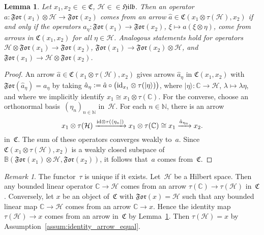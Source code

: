 \documentclass[a4paper]{amsart}
\numberwithin{equation}{section}
\theoremstyle{plain}
\numberwithin{theorem}{section}
\newtheorem{lemma}[theorem]{Lemma}
\theoremstyle{definition}
\theoremstyle{remark}
\newtheorem{remark}[theorem]{Remark}
\newcommand*{\ket}[1]{\lvert#1\rangle}%
\newcommand*{\bra}[1]{\langle#1\rvert}
\newcommand*{\inOb}{\mathrel{\in\in}}%
\newcommand*{\Cat}{\mathfrak C}     %
\newcommand*{\Hilb}{\mathfrak{Hilb}}%
\newcommand*{\Forget}{\mathfrak{For}}%
\newcommand*{\Trivial}{\tau}%
\newcommand*{\C}{\mathbb C}
\newcommand*{\N}{\mathbb N}
\newcommand*{\Bound}{\mathbb B}%
\newcommand*{\Id}{\textup{id}}%
\newcommand*{\Hils}[1][H]{\mathcal{#1}}%
\newcommand*{\defeq}{\mathrel{\vcentcolon=}}
\begin{document}
\begin{lemma}
  \label{lem:Sigma_over_trivial}
  Let \(x_1,x_2\inOb\Cat\),
  \(\Hils\inOb\Hilb\).
  Then an operator
  \(a\colon \Forget(x_1)\otimes\Hils \to \Forget(x_2)\)
  comes from an arrow \(\hat{a}\in\Cat(x_1\otimes\Trivial(\Hils),x_2)\)
  if and only if the operators
  \(a_\eta\colon \Forget(x_1)\to \Forget(x_2)\),
  \(\xi\mapsto a(\xi\otimes\eta)\),
  come from arrows in \(\Cat(x_1,x_2)\)
  for all \(\eta\in\Hils\).
  Analogous statements hold for operators
  \(\Hils\otimes\Forget(x_1)\to\Forget(x_2)\),
  \(\Forget(x_1)\to\Forget(x_2)\otimes\Hils\),
  and \(\Forget(x_1)\to\Hils\otimes\Forget(x_2)\).
\end{lemma}

\begin{proof}
  An arrow
  \(\hat{a}\in\Cat(x_1\otimes\Trivial(\Hils),x_2)\)
  gives arrows \(\hat{a}_\eta\)
  in \(\Cat(x_1,x_2)\)
  with \(\Forget(\hat{a}_\eta) = a_\eta\)
  by taking
  \(\hat{a}_\eta \defeq \hat{a}\circ \bigl(\Id_{x_1}\otimes
  \Trivial(\ket{\eta})\bigr)\),
  where \(\ket{\eta}\colon \C\to\Hils\),
  \(\lambda\mapsto \lambda\eta\),
  and where we implicitly identify
  \(x_1\cong x_1\otimes\Trivial(\C)\).
  For the converse, choose an orthonormal
  basis~\((\eta_n)_{n\in\N}\)
  in~\(\Hils\).
  For each \(n\in\N\),
  there is an arrow
  \[
  x_1 \otimes \Trivial(\Hils)
  \xrightarrow{\Id\otimes \Trivial(\bra{\eta_n})}
  x_1 \otimes \Trivial(\C) \cong x_1
  \xrightarrow{\hat{a}_{\eta_n}} x_2.
  \]
  in~\(\Cat\).
  The sum of these operators converges weakly to~\(a\).
  Since \(\Cat(x_1\otimes\Trivial(\Hils),x_2)\)
  is a weakly closed subspace of
  \(\Bound(\Forget(x_1)\otimes \Hils,\Forget(x_2))\),
  it follows that~\(a\)
  comes from~\(\Cat\).
\end{proof}

\begin{remark}
  \label{rem:trivial_unique}
  The functor~\(\Trivial\)
  is unique if it exists.  Let~\(\Hils\)
  be a Hilbert space.  Then any bounded linear operator \(\C\to\Hils\)
  comes from an arrow \(\Trivial(\C)\to\Trivial(\Hils)\)
  in~\(\Cat\).
  Conversely, let \(x\)
  be an object of~\(\Cat\)
  with \(\Forget(x)=\Hils\)
  such that any bounded linear map \(\C\to \Hils\)
  comes from an arrow \(\C\to x\).
  Hence the identity map \(\Trivial(\Hils)\to x\)
  comes from an arrow in~\(\Cat\)
  by Lemma~\ref{lem:Sigma_over_trivial}.  Then \(\Trivial(\Hils) = x\)
  by Assumption~\ref{assum:identity_arrow_equal}.
\end{remark}
\end{document}
